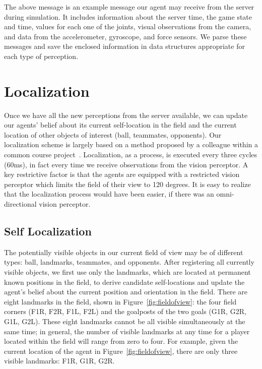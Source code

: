 \noindent
The above message is an example message our agent may receive from the server during simulation. It includes information about the server time, the game state and time, values for each one of the joints, visual observations from the camera, and data from the accelerometer, gyroscope, and force sensors. We parse these messages and save the enclosed information in data structures appropriate for each type of perception. 



\section{Localization}
Once we have all the new perceptions from the server available, we can update our agents' belief about its current self-location in the field and the current location of other objects of interest (ball, teammates, opponents). Our localization scheme is largely based on a method proposed by a colleague within a common course project~\cite{Localization}. Localization, as a process, is executed every three cycles (60ms), in fact every time we receive observations from the vision perceptor. 
A key restrictive factor is that the agents are equipped with a restricted vision perceptor which limits the field of their view to 120 degrees. 
It is easy to realize that the localization process would have been easier, if there was an omni-directional vision perceptor.





\subsection{Self Localization} 

The potentially visible objects in our current field of view may be of different types: ball, landmarks, teammates, and opponents. After registering all currently visible objects, we first use only the landmarks, which are located at permanent known positions in the field, to derive candidate self-locations and update the agent's belief about the current position and orientation in the field. There are eight landmarks in the field, shown in Figure~\ref{fig:fieldofview}: the four field corners (F1R, F2R, F1L, F2L) and the goalposts of the two goals (G1R, G2R, G1L, G2L). These eight landmarks cannot be all visible simultaneously at the same time; in general, the number of visible landmarks at any time for a player located within the field will range from zero to four. For example, given the current location of the agent in Figure~\ref{fig:fieldofview}, there are only three visible landmarks: F1R, G1R, G2R. 

